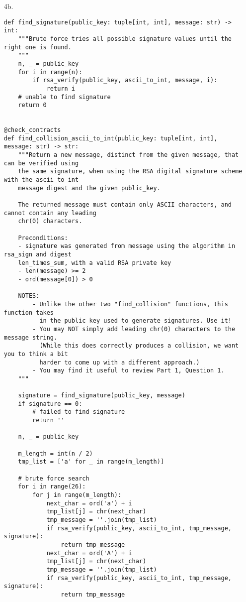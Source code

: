 \documentclass[11pt]{article}
\begin{document}
\begin{enumerate}
\newpage

\item[4b.]

\begin{verbatim}
def find_signature(public_key: tuple[int, int], message: str) -> int:
    """Brute force tries all possible signature values until the right one is found.
    """
    n, _ = public_key
    for i in range(n):
        if rsa_verify(public_key, ascii_to_int, message, i):
            return i
    # unable to find signature
    return 0


@check_contracts
def find_collision_ascii_to_int(public_key: tuple[int, int], message: str) -> str:
    """Return a new message, distinct from the given message, that can be verified using
    the same signature, when using the RSA digital signature scheme with the ascii_to_int
    message digest and the given public_key.

    The returned message must contain only ASCII characters, and cannot contain any leading
    chr(0) characters.

    Preconditions:
    - signature was generated from message using the algorithm in rsa_sign and digest
    len_times_sum, with a valid RSA private key
    - len(message) >= 2
    - ord(message[0]) > 0

    NOTES:
        - Unlike the other two "find_collision" functions, this function takes
          in the public key used to generate signatures. Use it!
        - You may NOT simply add leading chr(0) characters to the message string.
          (While this does correctly produces a collision, we want you to think a bit
          harder to come up with a different approach.)
        - You may find it useful to review Part 1, Question 1.
    """

    signature = find_signature(public_key, message)
    if signature == 0:
        # failed to find signature
        return ''

    n, _ = public_key

    m_length = int(n / 2)
    tmp_list = ['a' for _ in range(m_length)]

    # brute force search
    for i in range(26):
        for j in range(m_length):
            next_char = ord('a') + i
            tmp_list[j] = chr(next_char)
            tmp_message = ''.join(tmp_list)
            if rsa_verify(public_key, ascii_to_int, tmp_message, signature):
                return tmp_message
            next_char = ord('A') + i
            tmp_list[j] = chr(next_char)
            tmp_message = ''.join(tmp_list)
            if rsa_verify(public_key, ascii_to_int, tmp_message, signature):
                return tmp_message


\end{verbatim}
\end{enumerate}
\end{document}
